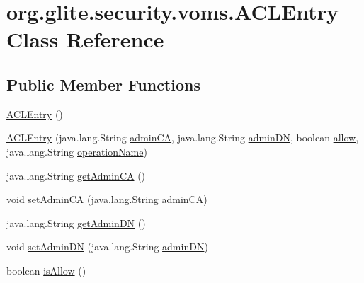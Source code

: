 \hypertarget{classorg_1_1glite_1_1security_1_1voms_1_1ACLEntry}{
\section{org.glite.security.voms.ACLEntry Class Reference}
\label{classorg_1_1glite_1_1security_1_1voms_1_1ACLEntry}
}
\subsection*{Public Member Functions}
\begin{DoxyCompactItemize}
\item 
\hyperlink{classorg_1_1glite_1_1security_1_1voms_1_1ACLEntry_a5d60444b264f5f6b0c7f264d7b47387a}{ACLEntry} ()
\item 
\hyperlink{classorg_1_1glite_1_1security_1_1voms_1_1ACLEntry_af8c3a4a7c458af91765ac0a24df8367e}{ACLEntry} (java.lang.String \hyperlink{classorg_1_1glite_1_1security_1_1voms_1_1ACLEntry_a0f569a1e865cbaaccd567fc21dc366c0}{adminCA}, java.lang.String \hyperlink{classorg_1_1glite_1_1security_1_1voms_1_1ACLEntry_a9addfee20d8b6819f2f356c71e33babb}{adminDN}, boolean \hyperlink{classorg_1_1glite_1_1security_1_1voms_1_1ACLEntry_a9027e97cddd9c2358783a1ce1df00979}{allow}, java.lang.String \hyperlink{classorg_1_1glite_1_1security_1_1voms_1_1ACLEntry_a77b8300ffe00ce97ec1a27eb245b4a0e}{operationName})
\item 
java.lang.String \hyperlink{classorg_1_1glite_1_1security_1_1voms_1_1ACLEntry_aaec4209fed8e2f9b754c8245d5d974a8}{getAdminCA} ()
\item 
void \hyperlink{classorg_1_1glite_1_1security_1_1voms_1_1ACLEntry_a4e19fc00ed4b37f57b4281d9fd8a612b}{setAdminCA} (java.lang.String \hyperlink{classorg_1_1glite_1_1security_1_1voms_1_1ACLEntry_a0f569a1e865cbaaccd567fc21dc366c0}{adminCA})
\item 
java.lang.String \hyperlink{classorg_1_1glite_1_1security_1_1voms_1_1ACLEntry_a1616b1b87e85b38798aa0859dd58400e}{getAdminDN} ()
\item 
void \hyperlink{classorg_1_1glite_1_1security_1_1voms_1_1ACLEntry_af3b1115f0c433bf415f0a0405d6b9f21}{setAdminDN} (java.lang.String \hyperlink{classorg_1_1glite_1_1security_1_1voms_1_1ACLEntry_a9addfee20d8b6819f2f356c71e33babb}{adminDN})
\item 
boolean \hyperlink{classorg_1_1glite_1_1security_1_1voms_1_1ACLEntry_a7465eed80b69b74988a9100cc49036e7}{isAllow} ()
\item 

\end{DoxyCompactItemize}
